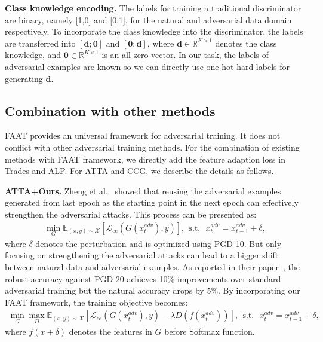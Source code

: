 \documentclass[10pt,twocolumn,letterpaper]{article}
\begin{document}
\noindent\textbf{Class knowledge encoding.} The labels for training a traditional discriminator are binary, namely [1,0] and [0,1], for the natural and adversarial data domain respectively. To incorporate the class knowledge into the discriminator, the labels are transferred into $[\textbf{d};\textbf{0}]$ and $[\textbf{0};\textbf{d}]$, where $\textbf{d}\in \mathbb{R}^{K\times 1}$ denotes the class knowledge, and $\textbf{0}\in \mathbb{R}^{K\times 1}$ is an all-zero vector. In our task, the labels of adversarial examples are known so we can directly use one-hot hard labels for generating $\textbf{d}$. 

\subsection{Combination with other methods}
FAAT provides an universal framework for adversarial training. It does not conflict with other adversarial training methods. For the combination of existing methods with FAAT framework, we directly add the feature adaption loss in Trades and ALP. For ATTA and CCG, we describe the details as follows.

\vspace{5pt}
\noindent\textbf{ATTA+Ours.} Zheng et al.~\cite{zheng2020efficient} showed that reusing the adversarial examples generated from last epoch as the starting point in the next epoch can effectively strengthen the adversarial attacks. This process can be presented as:
\begin{equation}
\begin{aligned}
\label{eq:ob}
		\min _{G} \mathbb{E}_{(x, y) \sim \mathcal{X}}[ \mathcal{L}_{ce}(G( x^{adv}_t), y)], ~~\text{s.t.}~~~ x^{adv}_t = x^{adv}_{t-1}+\delta,
\end{aligned}
\end{equation}
where $\delta$ denotes the perturbation and is optimized using PGD-10. But only focusing on strengthening the adversarial attacks can lead to a bigger shift between natural data and adversarial examples. As reported in their paper~\cite{zheng2020efficient}, the robust accuracy against PGD-20 achieves 10\% improvements over standard adversarial training but the natural accuracy drops by 5\%. By incorporating our FAAT framework, the training objective becomes:
\begin{equation}
\begin{aligned}
\label{eq:ob}
		\min_{G} \max_{D} \mathbb{E}_{(x, y) \sim \mathcal{X}}[ \mathcal{L}_{ce}(G( x^{adv}_t), y)-\lambda D(f( x^{adv}_t))],  ~~\text{s.t.}~~~ x^{adv}_t = x^{adv}_{t-1}+\delta,
\end{aligned}
\end{equation}
where $f( x+\delta)$ denotes the features in $G$ before Softmax function.
\vspace{5pt}
\end{document}
